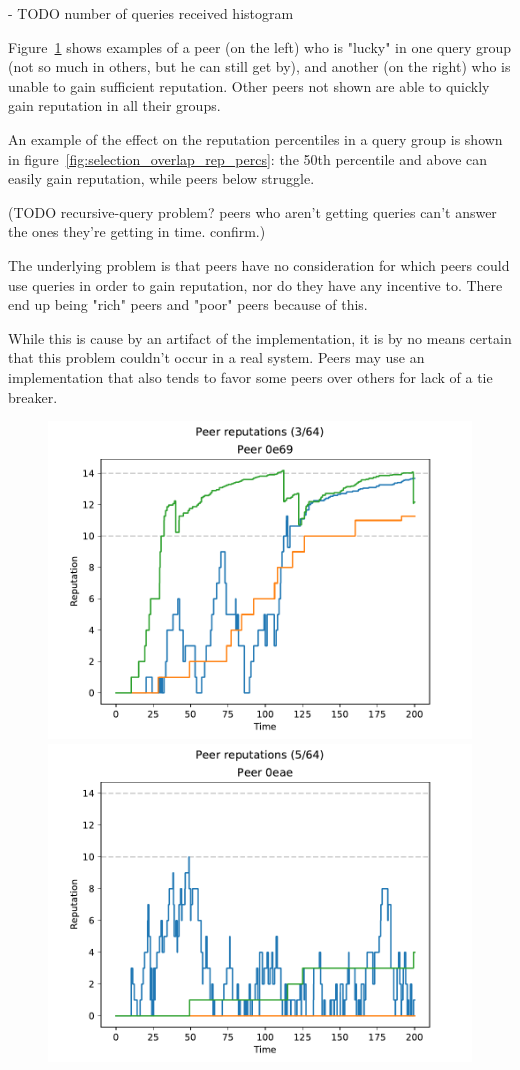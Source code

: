 - TODO number of queries received histogram

Figure~\ref{fig:selection_overlap_peer_reps} shows examples of a peer (on the
left) who is "lucky" in one query group (not so much in others, but he can still
get by), and another (on the right) who is unable to gain sufficient reputation.
Other peers not shown are able to quickly gain reputation in all their groups.

An example of the effect on the reputation percentiles in a query group is shown
in figure~\ref{fig:selection_overlap_rep_percs}: the 50th percentile and above
can easily gain reputation, while peers below struggle.

(TODO recursive-query problem? peers who aren't getting queries can't answer the
ones they're getting in time. confirm.)

The underlying problem is that peers have no consideration for which peers could
use queries in order to gain reputation, nor do they have any incentive to.
There end up being "rich" peers and "poor" peers because of this.

While this is cause by an artifact of the implementation, it is by no means
certain that this problem couldn't occur in a real system. Peers may use an
implementation that also tends to favor some peers over others for lack of a tie
breaker.

\begin{figure}[t]
\centering
\includegraphics[width=0.5\columnwidth]{figures/selection_overlap_peer_reps_3_of_64}%
\includegraphics[width=0.5\columnwidth]{figures/selection_overlap_peer_reps_5_of_64}
\label{fig:selection_overlap_peer_reps}
\end{figure}

